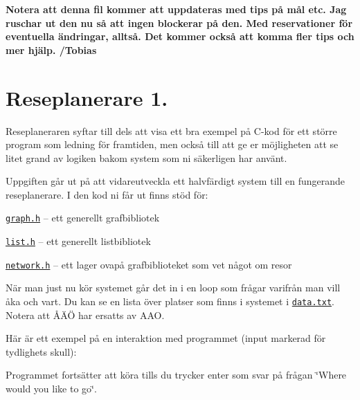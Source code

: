{\bfseries Notera att denna fil kommer att uppdateras med tips på mål etc. Jag ruschar ut den nu så att ingen blockerar på den. Med reservationer för eventuella ändringar, alltså. Det kommer också att komma fler tips och mer hjälp. /\+Tobias}

\section*{Reseplanerare 1.}

Reseplaneraren syftar till dels att visa ett bra exempel på C-\/kod för ett större program som ledning för framtiden, men också till att ge er möjligheten att se litet grand av logiken bakom system som ni säkerligen har använt.

Uppgiften går ut på att vidareutveckla ett halvfärdigt system till en fungerande reseplanerare. I den kod ni får ut finns stöd för\+:


\begin{DoxyItemize}
\item \href{graph.h}{\tt graph.\+h} -- ett generellt grafbibliotek
\item \href{list.h}{\tt list.\+h} -- ett generellt listbibliotek
\item \href{network.h}{\tt network.\+h} -- ett lager ovapå grafbiblioteket som vet något om resor
\end{DoxyItemize}

När man just nu kör systemet går det in i en loop som frågar varifrån man vill åka och vart. Du kan se en lista över platser som finns i systemet i \href{data.txt}{\tt data.\+txt}. Notera att ÅÄÖ har ersatts av A\+A\+O.

Här är ett exempel på en interaktion med programmet (input markerad för tydlighets skull)\+:




Programmet fortsätter att köra tills du trycker enter som svar på frågan \char`\"{}\+Where would you like to go\char`\"{}.

